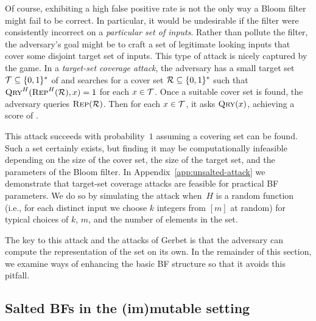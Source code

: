 %
%
Of course, exhibiting a high false positive rate is not the only way a Bloom
filter might fail to be correct. In particular, it would be undesirable if the
filter were consistently incorrect on a \emph{particular set of inputs}. Rather
than pollute the filter, the adversary's goal might be to craft a set of
legitimate looking inputs that cover some disjoint target set of inputs.
%
This type of attack is nicely captured by the  game.
%
In a \emph{target-set coverage attack}, the adversary has a small target set
$\mathcal{T}\subseteq\{0,1\}^*$ of and searches for a cover set $\mathcal{R}\subseteq\{0,1\}^*$
such that $\textnormal{\textsc{Qry}}^H(\textnormal{\textsc{Rep}}^H(\mathcal{R}),x)=1$ for each $x\in\mathcal{T}$.
%
Once a suitable cover set is found, the adversary queries $\textnormal{\textsc{Rep}}(\mathcal{R})$. Then
for each $x\in\mathcal{T}$, it asks $\textnormal{\textsc{Qry}}(x)$, achieving a score of .

This attack succeeds with probability~$1$ assuming a covering set can be found.
Such a set certainly exists, but finding it may be computationally infeasible
depending on the size of the cover set, the size of the target set, and the
parameters of the Bloom filter.
%
In Appendix~\ref{app:unsalted-attack} we demonstrate that target-set coverage
attacks are feasible for practical BF parameters. We do so by simulating the
attack when~$H$ is a random function (i.e., for each distinct input we choose
$k$ integers from $[m]$ at random) for typical choices of $k$, $m$, and the
number of elements in the set.
%


The key to this attack and the attacks of Gerbet \etal is that the adversary
can compute the representation of the set on its own. In the remainder of this
section, we examine ways of enhancing the basic BF structure so that it avoids
this pitfall.

\subsection{Salted BFs in the (im)mutable setting}

